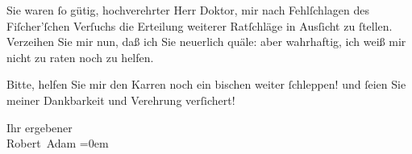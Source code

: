 \pstart
           Sie waren ſo gütig, hochverehrter Herr Doktor, mir nach Fehlſchlagen des Fiſcher’ſchen Verſuchs die Erteilung weiterer
               Ratſchläge in Ausſicht zu ſtellen. Verzeihen Sie mir nun, daß ich Sie neuerlich
               quäle: aber wahrhaftig, ich weiß mir nicht zu raten noch zu helfen.\pend
           
\pstart
           Bitte, helfen Sie mir den Karren noch ein bischen weiter ſchleppen! und ſeien Sie
               meiner Dankbarkeit und {\pb}Verehrung verſichert!\pend
           
\pstart
           Ihr ergebener{\\[\baselineskip]}\spacefill\mbox{Robert Adam}\pend
           \leftskip=0em{}\endnumbering{}  
      